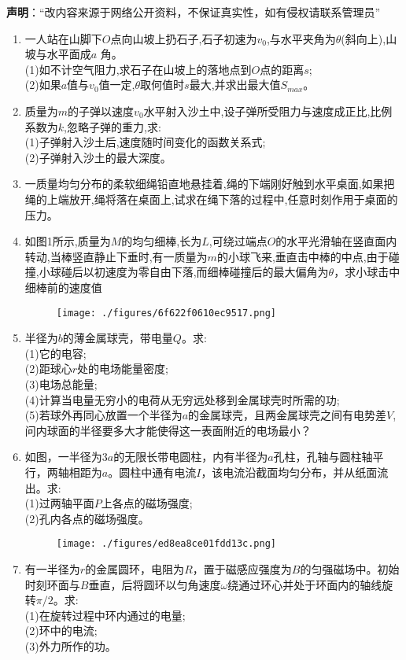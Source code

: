


\textbf{声明}：“改内容来源于网络公开资料，不保证真实性，如有侵权请联系管理员” 


\begin{enumerate}
\item 一人站在山脚下$O$点向山坡上扔石子,石子初速为$v_0$,与水平夹角为$\theta$(斜向上),山坡与水平面成$a$ 角。\\
(1)如不计空气阻力,求石子在山坡上的落地点到$O$点的距离$s$;\\
(2)如果$a$值与$v_0$值一定,$\theta$取何值时$s$最大,并求出最大值$S_{max}$。
\item 质量为$m$的子弹以速度$v_0$水平射入沙土中,设子弹所受阻力与速度成正比,比例系数为$k$,忽略子弹的重力,求:\\
(1)子弹射入沙土后,速度随时间变化的函数关系式;\\
(2)子弹射入沙土的最大深度。
\item 一质量均匀分布的柔软细绳铅直地悬挂着,绳的下端刚好触到水平桌面,如果把绳的上端放开,绳将落在桌面上,试求在绳下落的过程中,任意时刻作用于桌面的压力。
\item 如图1所示,质量为$M$的均匀细棒,长为$L$,可绕过端点$O$的水平光滑轴在竖直面内转动,当棒竖直静止下垂时,有一质量为$m$的小球飞来,垂直击中棒的中点,由于碰撞,小球碰后以初速度为零自由下落,而细棒碰撞后的最大偏角为$\theta$，求小球击中细棒前的速度值
\begin{figure}[ht]
\centering
\texttt{[image: ./figures/6f622f0610ec9517.png]}
\caption{} \label{fig_SSD15_1}
\end{figure}
\item 半径为$b$的薄金属球壳，带电量$Q$。求:\\
(1)它的电容;\\
(2)距球心$r$处的电场能量密度;\\
(3)电场总能量;\\
(4)计算当电量无穷小的电荷从无穷远处移到金属球壳时所需的功;\\
(5)若球外再同心放置一个半径为$a$的金属球壳，且两金属球壳之间有电势差$V$,问内球面的半径要多大才能使得这一表面附近的电场最小？
\item 如图，一半径为$3a$的无限长带电圆柱，内有半径为$a$孔柱，孔轴与圆柱轴平行，两轴相距为$a$。圆柱中通有电流$I$，该电流沿截面均匀分布，并从纸面流出。求:\\
(1)过两轴平面$P$上各点的磁场强度;\\
(2)孔内各点的磁场强度。
\begin{figure}[ht]
\centering
\texttt{[image: ./figures/ed8ea8ce01fdd13c.png]}
\caption{} \label{fig_SSD15_2}
\end{figure}
\item 有一半径为$r$的金属圆环，电阻为$R$，置于磁感应强度为$B$的匀强磁场中。初始时刻环面与$B$垂直，后将圆环以匀角速度$\omega$绕通过环心并处于环面内的轴线旋转$\pi/2$。求:\\
(1)在旋转过程中环内通过的电量;\\
(2)环中的电流;\\
(3)外力所作的功。
\end{enumerate}